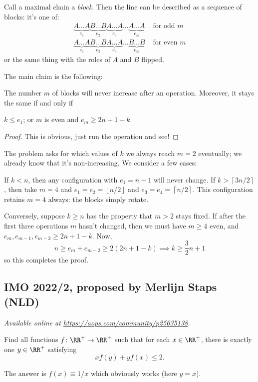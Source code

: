 \documentclass[11pt]{scrartcl}
\begin{document}
Call a maximal chain a \emph{block}.
Then the line can be described as a sequence of blocks: it's one of:
\begin{align*}
  \underbrace{A\dots A}_{e_1}
  \underbrace{B\dots B}_{e_2}
  \underbrace{A\dots A}_{e_3}
  \dots
  \underbrace{A\dots A}_{e_m} & \text{ for odd $m$} \\
  \underbrace{A\dots A}_{e_1}
  \underbrace{B\dots B}_{e_2}
  \underbrace{A\dots A}_{e_3}
  \dots
  \underbrace{B\dots B}_{e_m} & \text{ for even $m$}
\end{align*}
or the same thing with the roles of $A$ and $B$ flipped.

The main claim is the following:
\begin{claim*}
  The number $m$ of blocks will never increase after an operation.
  Moreover, it stays the same if and only if
  \begin{itemize}
    \ii $k \le e_1$; or
    \ii $m$ is even and $e_m \ge 2n+1-k$.
  \end{itemize}
\end{claim*}
\begin{proof}
  This is obvious, just run the operation and see!
\end{proof}

The problem asks for which values of $k$ we always reach $m=2$ eventually;
we already know that it's non-increasing.
We consider a few cases:
\begin{itemize}
  \ii If $k < n$, then any configuration with $e_1 = n-1$ will never change.
  \ii If $k > \left\lceil 3n/2 \right\rceil$,
  then take $m=4$ and $e_1 = e_2 = \left\lfloor n/2 \right\rfloor$
  and $e_3 = e_4 = \left\lceil n/2 \right\rceil$.
  This configuration retains $m=4$ always:
  the blocks simply rotate.

  \ii Conversely, suppose $k \ge n$ has the property that $m > 2$ stays fixed.
  If after the first three operations $m$ hasn't changed,
  then we must have $m \ge 4$ even, and $e_m, e_{m-1}, e_{m-2} \ge 2n+1 - k$.
  Now,
  \[ n \ge e_m + e_{m-2} \ge 2(2n+1-k) \implies k \ge \frac 32 n + 1 \]
  so this completes the proof.
\end{itemize}
\pagebreak

\subsection{IMO 2022/2, proposed by Merlijn Staps (NLD)}
\textsl{Available online at \url{https://aops.com/community/p25635138}.}
\begin{mdframed}[style=mdpurplebox,frametitle={Problem statement}]
Find all functions $f \colon \RR^+ \to \RR^+$ such that for each $x \in \RR^+$,
there is exactly one $y \in \RR^+$ satisfying \[ xf(y)+yf(x) \leq 2. \]
\end{mdframed}
The answer is $f(x) \equiv 1/x$ which obviously works (here $y=x$).
\end{document}
